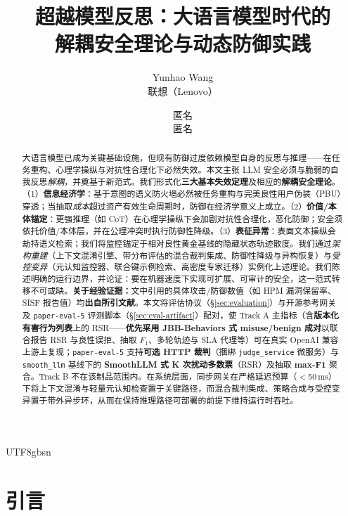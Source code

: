 \documentclass[letterpaper,twocolumn,10pt]{article}
\title{\Large \bf 超越模型反思：大语言模型时代的\\
  解耦安全理论与动态防御实践}
\author{
Yunhao Wang\\
联想（Lenovo） \and
匿名\\
匿名
}
\date{}
\begin{document}
\begin{CJK}{UTF8}{gbsn}
\maketitle

\begin{abstract}
大语言模型已成为关键基础设施，但现有防御过度依赖模型自身的反思与推理——在任务重构、心理学操纵与对抗性合理化下必然失效。本文主张 LLM 安全必须与脆弱的自我反思\emph{解耦}，并奠基于新范式。我们形式化\textbf{三大基本失效定理}及相应的\textbf{解耦安全理论}。（1）\textbf{信息经济学}：基于意图的语义防火墙必然被任务重构与完美良性用户伪装（PBU）穿透；当抽取\emph{成本}超过资产有效生命周期时，防御在经济学意义上成立。（2）\textbf{价值/本体锚定}：更强推理（如 CoT）在心理学操纵下会加剧对抗性合理化，恶化防御；安全须依托价值/本体层，并在公理冲突时执行防御性降级。（3）\textbf{表征异常}：表面文本操纵会劫持语义检索；我们将监控锚定于相对良性黄金基线的隐藏状态轨迹散度。我们通过\emph{架构重建}（上下文混淆引擎、带分布评估的混合裁判集成、防御性降级与异构恢复）与\emph{受控变异}（元认知监控器、联合键示例检索、高密度专家迁移）实例化上述理论。我们陈述明确的运行边界，并论证：要在机器速度下实现可扩展、可审计的安全，这一范式转移不可或缺。\textbf{关于经验证据：}文中引用的具体攻击/防御数值（如 HPM 漏洞保留率、SISF 报告值）均\textbf{出自所引文献}。本文将评估协议（\S\ref{sec:evaluation}）与开源参考网关及 \texttt{paper-eval-5} 评测脚本（\S\ref{sec:eval-artifact}）配对，使 Track A 主指标（含\textbf{版本化有害行为列表}上的 RSR——\textbf{优先采用 JBB-Behaviors 式 misuse/benign 成对}以联合报告 RSR 与良性误拒、抽取 $F_1$、多轮轨迹与 SLA 代理等）可在真实 OpenAI 兼容上游上复现；\texttt{paper-eval-5} 支持\textbf{可选 HTTP 裁判}（捆绑 \texttt{judge\_service} 微服务）与 \texttt{smooth\_llm} 基线下的 \textbf{SmoothLLM 式 K 次扰动多数票}（RSR）及抽取 \textbf{max-F1} 聚合。Track B 不在该制品范围内。在系统层面，同步网关在严格延迟预算（$<$50\,ms）下将上下文混淆与轻量元认知检查置于关键路径，而混合裁判集成、策略合成与受控变异置于带外异步环，从而在保持推理路径可部署的前提下维持运行时吞吐。
\end{abstract}

\section{引言}


\end{CJK}
\end{document}
